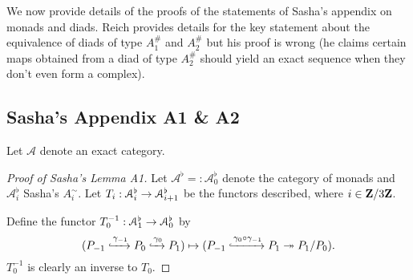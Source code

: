 \documentclass[deligne.tex]{subfiles}
\begin{document}
We now provide details of the proofs of the
statements of Sasha's appendix on monads and diads. Reich provides details
for the key statement about the equivalence of diads of type $A_1^\#$ and
$A_2^\#$ but his proof is wrong (he claims certain maps obtained from a diad
of type $A_2^\#$ should yield an exact sequence when they don't even form a
complex).

\subsection*{Sasha's Appendix A1 \& A2}
Let $\mathcal A$ denote an exact category.
\begin{proof}[Proof of Sasha's Lemma A1]
Let $\mathcal A^\flat=:\mathcal A_0^\flat$ denote the category of 
monads and $\mathcal A^\flat_i$ Sasha's $A_i^\sim$.
Let $T_i:\mathcal A^\flat_i\rightarrow\mathcal A^\flat_{i+1}$ be the functors
described, where $i\in\mathbf{Z}/3\mathbf{Z}$.
	
Define the functor $T_0^{-1}:\mathcal A^\flat_1\rightarrow\mathcal A^\flat_0$ by
\begin{equation*}
	(P_{-1}\xhookrightarrow{\gamma_{-1}}P_0\xhookrightarrow{\gamma_0}P_1)
	\mapsto(P_{-1}\xhookrightarrow{\gamma_0\circ\gamma_{-1}}P_1\twoheadrightarrow P_1/P_0).
\end{equation*}
$T_0^{-1}$ is clearly an inverse to $T_0$.


\end{proof}
\end{document}
